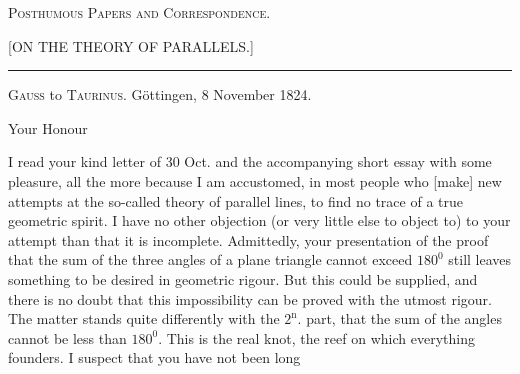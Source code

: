\clearpage{}
\begin{center}
{\Large\textsc{Posthumous Papers and Correspondence.}}
\end{center}

\bigskip
\begin{center}[ON THE THEORY OF PARALLELS.]\end{center}
\begin{center}\rule{2.5cm}{0.4pt}\end{center}

\begin{center}
\textsc{Gauss} to \textsc{Taurinus}. Göttingen, 8 November 1824.
\end{center}

\begin{center}Your Honour\end{center}

I read your kind letter of 30 Oct. and the accompanying short essay with some
pleasure, all the more because I am accustomed, in most people who
[make] new attempts at the so-called theory of parallel lines, to find no trace of
a true geometric spirit. I have no other objection (or very little else to object to)
to your attempt than that it is incomplete. Admittedly, your presentation of the proof
that the sum of the three angles of a plane triangle cannot exceed $180^{0}$ still leaves
something to be desired in geometric rigour. But this could be supplied,
and there is no doubt that this impossibility can be proved with the
utmost rigour. The matter stands quite differently with the $2^{\mathrm n}.$ part,
that the sum of the angles cannot be less than $180^{0}$. This is the real
knot, the reef on which everything founders. I suspect that you have not been long
